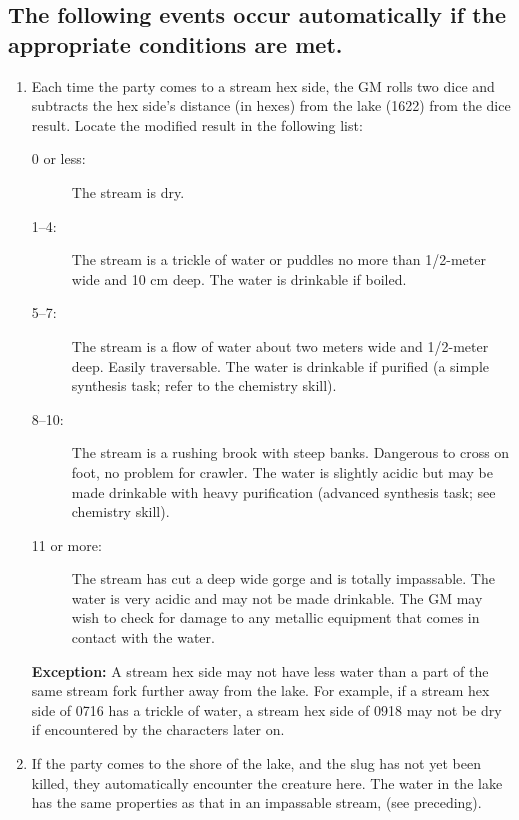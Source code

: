 \subsection[Automatic Events]{The following events occur automatically
  if the appropriate conditions are met.}
\label{sec:foll-events-occur}

\begin{enumerate}
\item Each time the party comes to a stream hex side, the GM rolls two
  dice and subtracts the hex side's distance (in hexes) from the lake
  (1622) from the dice result. Locate the modified result in the
  following list:

  \begin{description}
  \item[0 or less:] The stream is dry. 
  \item[1--4:] The stream is a trickle of water or puddles no more
    than 1/2-meter wide and 10 cm deep. The water is drinkable if
    boiled.
  \item[5--7:] The stream is a flow of water about two meters wide and
    1/2-meter deep. Easily traversable. The water is drinkable if
    purified (a simple synthesis task; refer to the chemistry skill).
  \item[8--10:] The stream is a rushing brook with steep banks.
    Dangerous to cross on foot, no problem for crawler. The water is
    slightly acidic but may be made drinkable with heavy purification
    (advanced synthesis task; see chemistry skill).
  \item[11 or more:] The stream has cut a deep wide gorge and is
    totally impassable. The water is very acidic and may not be made
    drinkable.  The GM may wish to check for damage to any metallic
    equipment that comes in contact with the water.
  \end{description}
  
  \textbf{Exception:} A stream hex side may not have less water than a
  part of the same stream fork further away from the lake. For
  example, if a stream hex side of 0716 has a trickle of water, a
  stream hex side of 0918 may not be dry if encountered by the
  characters later on.
  
\item If the party comes to the shore of the lake, and the slug has
  not yet been killed, they automatically encounter the creature here.
  The water in the lake has the same properties as that in an
  impassable stream, (see preceding).
  

\end{enumerate}
